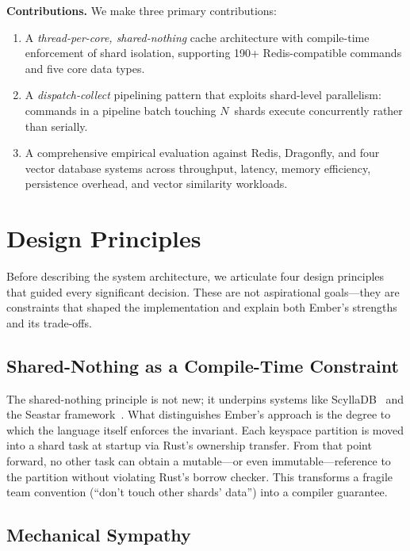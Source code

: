 \documentclass[conference]{IEEEtran}
\begin{document}
\medskip
\noindent\textbf{Contributions.} We make three primary contributions:
\begin{enumerate}
  \item A \emph{thread-per-core, shared-nothing} cache architecture
    with compile-time enforcement of shard isolation, supporting 190+
    Redis-compatible commands and five core data types.
  \item A \emph{dispatch-collect} pipelining pattern that exploits
    shard-level parallelism: commands in a pipeline batch touching
    $N$~shards execute concurrently rather than serially.
  \item A comprehensive empirical evaluation against Redis, Dragonfly,
    and four vector database systems across throughput, latency, memory
    efficiency, persistence overhead, and vector similarity workloads.
\end{enumerate}


\section{Design Principles}
\label{sec:principles}

Before describing the system architecture, we articulate four design
principles that guided every significant decision. These are not
aspirational goals---they are constraints that shaped the
implementation and explain both Ember's strengths and its trade-offs.

\subsection{Shared-Nothing as a Compile-Time Constraint}

The shared-nothing principle is not new; it underpins systems like
ScyllaDB~\cite{scylladb} and the Seastar framework~\cite{seastar}.
What distinguishes Ember's approach is the degree to which the
language itself enforces the invariant. Each keyspace partition is
moved into a shard task at startup via Rust's ownership transfer. From
that point forward, no other task can obtain a mutable---or even
immutable---reference to the partition without violating Rust's
borrow checker. This transforms a fragile team convention (``don't
touch other shards' data'') into a compiler guarantee.

\subsection{Mechanical Sympathy}
\end{document}
